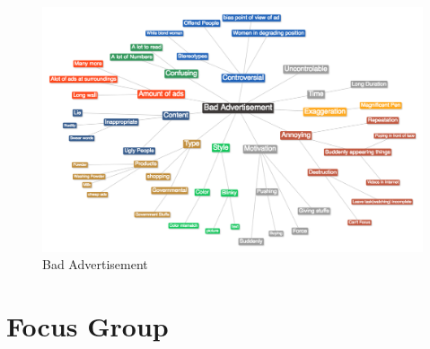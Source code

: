 \begin{appendices}
\begin{figure}[H]
 \centering 
    \includegraphics[width=\textwidth,height=0.45\textheight]{Appendices/3/bad_ad.jpg}
    \caption{Bad Advertisement}
     \label{app:badadver}%
\end{figure}


%

\chapter{Focus Group}


\end{appendices}
